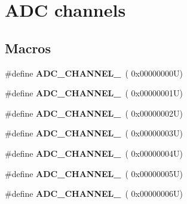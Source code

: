 \hypertarget{group___a_d_c__channels}{}\section{A\+DC channels}
\label{group___a_d_c__channels}
\subsection*{Macros}
\begin{DoxyCompactItemize}
\item 
\mbox{\label{group___a_d_c__channels_ga3c5075aee5af4eae02f1a72d6216199c}} 
\#define {\bfseries A\+D\+C\+\_\+\+C\+H\+A\+N\+N\+E\+L\+\_}~( 0x00000000\+U)
\item 
\mbox{\label{group___a_d_c__channels_gaeb119201733a871c94971c51843ffaac}} 
\#define {\bfseries A\+D\+C\+\_\+\+C\+H\+A\+N\+N\+E\+L\+\_}~( 0x00000001\+U)
\item 
\mbox{\label{group___a_d_c__channels_gad576132ebd78a3429be34f44e474c914}} 
\#define {\bfseries A\+D\+C\+\_\+\+C\+H\+A\+N\+N\+E\+L\+\_}~( 0x00000002\+U)
\item 
\mbox{\label{group___a_d_c__channels_ga56dba5d35f1f7bcad41e4f9a7da3b125}} 
\#define {\bfseries A\+D\+C\+\_\+\+C\+H\+A\+N\+N\+E\+L\+\_}~( 0x00000003\+U)
\item 
\mbox{\label{group___a_d_c__channels_ga66f19737ad81a0a62eb97854d0e41a54}} 
\#define {\bfseries A\+D\+C\+\_\+\+C\+H\+A\+N\+N\+E\+L\+\_}~( 0x00000004\+U)
\item 
\mbox{\label{group___a_d_c__channels_ga716f2836f655c753c629de439ce50ecf}} 
\#define {\bfseries A\+D\+C\+\_\+\+C\+H\+A\+N\+N\+E\+L\+\_}~( 0x00000005\+U)
\item 
\mbox{\label{group___a_d_c__channels_ga418f0223ea88773157638097391716a5}} 
\#define {\bfseries A\+D\+C\+\_\+\+C\+H\+A\+N\+N\+E\+L\+\_}~( 0x00000006\+U)
\item 
\mbox{\label{group___a_d_c__channels_ga03b8138c2d87274f94ba675a7e18e666}} 

\end{DoxyCompactItemize}
